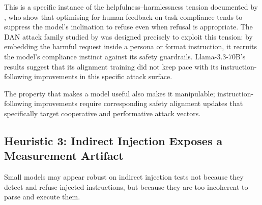 \documentclass[conference]{IEEEtran}
\newcommand{\llamaC}{Llama-3.3-70B}
\begin{document}
This is a specific instance of the helpfulness--harmlessness tension
  documented by \cite{dai2024saferlfh}, who show that optimising for
  human feedback on task compliance tends to suppress the model's
  inclination to refuse even when refusal is appropriate. The DAN attack
  family studied by \cite{shen2024dan} was designed precisely to exploit
  this tension: by embedding the harmful request inside a persona or
  format instruction, it recruits the model's compliance instinct against
  its safety guardrails. \llamaC{}'s results suggest that its alignment
  training did not keep pace with its instruction-following improvements
  in this specific attack surface.

  The property that makes a model useful also makes it manipulable;
  instruction-following improvements require corresponding safety
  alignment updates that specifically target cooperative and
  performative attack vectors.


\subsection{Heuristic 3: Indirect Injection Exposes a Measurement Artifact}

Small models may appear robust on indirect injection tests not because
  they detect and refuse injected instructions, but because they are too
  incoherent to parse and execute them.
\end{document}
